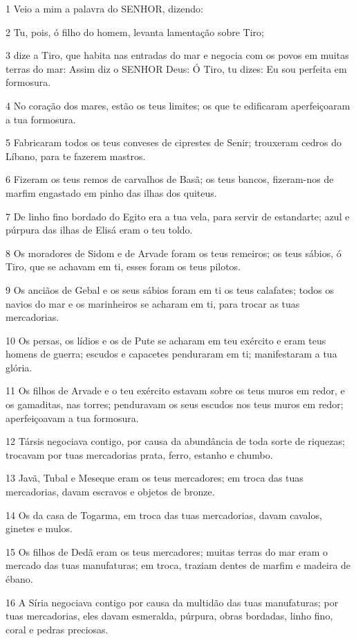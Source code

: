 \par 1 Veio a mim a palavra do SENHOR, dizendo:
\par 2 Tu, pois, ó filho do homem, levanta lamentação sobre Tiro;
\par 3 dize a Tiro, que habita nas entradas do mar e negocia com os povos em muitas terras do mar: Assim diz o SENHOR Deus: Ó Tiro, tu dizes: Eu sou perfeita em formosura.
\par 4 No coração dos mares, estão os teus limites; os que te edificaram aperfeiçoaram a tua formosura.
\par 5 Fabricaram todos os teus conveses de ciprestes de Senir; trouxeram cedros do Líbano, para te fazerem mastros.
\par 6 Fizeram os teus remos de carvalhos de Basã; os teus bancos, fizeram-nos de marfim engastado em pinho das ilhas dos quiteus.
\par 7 De linho fino bordado do Egito era a tua vela, para servir de estandarte; azul e púrpura das ilhas de Elisá eram o teu toldo.
\par 8 Os moradores de Sidom e de Arvade foram os teus remeiros; os teus sábios, ó Tiro, que se achavam em ti, esses foram os teus pilotos.
\par 9 Os anciãos de Gebal e os seus sábios foram em ti os teus calafates; todos os navios do mar e os marinheiros se acharam em ti, para trocar as tuas mercadorias.
\par 10 Os persas, os lídios e os de Pute se acharam em teu exército e eram teus homens de guerra; escudos e capacetes penduraram em ti; manifestaram a tua glória.
\par 11 Os filhos de Arvade e o teu exército estavam sobre os teus muros em redor, e os gamaditas, nas torres; penduravam os seus escudos nos teus muros em redor; aperfeiçoavam a tua formosura.
\par 12 Társis negociava contigo, por causa da abundância de toda sorte de riquezas; trocavam por tuas mercadorias prata, ferro, estanho e chumbo.
\par 13 Javã, Tubal e Meseque eram os teus mercadores; em troca das tuas mercadorias, davam escravos e objetos de bronze.
\par 14 Os da casa de Togarma, em troca das tuas mercadorias, davam cavalos, ginetes e mulos.
\par 15 Os filhos de Dedã eram os teus mercadores; muitas terras do mar eram o mercado das tuas manufaturas; em troca, traziam dentes de marfim e madeira de ébano.
\par 16 A Síria negociava contigo por causa da multidão das tuas manufaturas; por tuas mercadorias, eles davam esmeralda, púrpura, obras bordadas, linho fino, coral e pedras preciosas.
